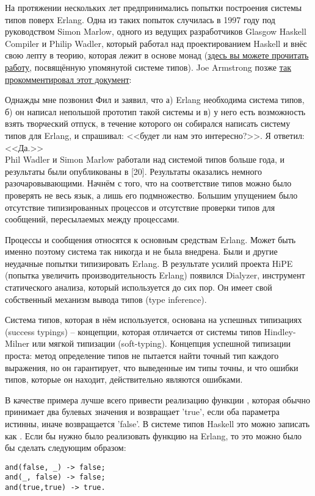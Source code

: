 На протяжении нескольких лет предпринимались попытки построения системы типов поверх Erlang.
Одна из таких попыток случилась в 1997 году под руководством Simon Marlow, одного из ведущих разработчиков Glasgow Haskell Compiler и Philip Wadler, который работал над проектированием Haskell и внёс свою лепту в теорию, которая лежит в основе монад (\href{http://www.haskell.org/~simonmar/papers/erltc.pdf}{здесь вы можете прочитать работу}, посвящённую упомянутой системе типов).
Joe Armstrong позже \href{http://www.cs.chalmers.se/Cs/Grundutb/Kurser/ppxt/HT2007/general/languages/armstrong-erlang\_history.pdf}{так прокомментировал этот документ}:\\
\colorbox{lgray}
{
    \begin{minipage}{\linewidth}
Однажды мне позвонил Фил и заявил, что а) Erlang необходима система типов, б) он написал непольшой прототип такой системы и в) у него есть возможность взять творческий отпуск, в течение которого он собирался написать систему типов для Erlang, и спрашивал: <<будет ли нам это интересно?>>.
Я ответил: <<Да.>>\\
Phil Wadler и Simon Marlow работали над системой типов больше года, и результаты были опубликованы в [20].
Результаты оказались немного разочаровывающими.
Начнём с того, что на соответствие типов можно было проверять не весь язык, а лишь его подмножество.
Большим упущением было отсутствие типизированных процессов и отсутствие проверки типов для сообщений, пересылаемых между процессами.
    \end{minipage}
}

Процессы и сообщения относятся к основным средствам Erlang.
Может быть именно поэтому система так никогда и не была внедрена.
Были и другие неудачные попытки типизировать Erlang.
В результате усилий проекта HiPE (попытка увеличить производительность Erlang) появился Dialyzer, инструмент статического анализа, который используется до сих пор.
Он имеет свой собственный механизм вывода типов (type inference).

Система типов, которая в нём используется, основана на успешных типизациях (success typings) \--- концепции, которая отличается от системы типов Hindley\--Milner или мягкой типизации (soft\--typing).
Концепция успешной типизации проста: метод определение типов не пытается найти точный тип каждого выражения, но он гарантирует, что выведенные им типы точны, и что ошибки типов, которые он находит, действительно являются ошибками.

В качестве примера лучше всего привести реализацию функции , которая обычно принимает два булевых значения и возвращает 'true', если оба параметра истинны, иначе возвращается 'false'.
В системе типов Haskell это можно записать как .
Если бы нужно было реализовать функцию  на Erlang, то это можно было бы сделать следующим образом:
\begin{lstlisting}[style=erlang]
and(false, _) -> false;
and(_, false) -> false;
and(true,true) -> true.
\end{lstlisting}

